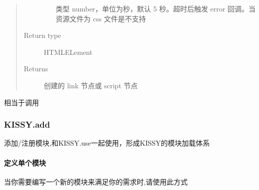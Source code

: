\documentclass[letterpaper,10pt,english]{sphinxmanual}
\begin{document}
\begin{fulllineitems}
\begin{quote}
\begin{description}
\begin{itemize}
\begin{fulllineitems}
\end{fulllineitems}



\begin{fulllineitems}
\label{api/seed/loader/getScript:Loader.config.timeout}
类型 number，单位为秒，默认 5 秒。超时后触发 error 回调。当资源文件为 css 文件是不支持

\end{fulllineitems}



\end{itemize}

\item[{Return type}] \leavevmode
HTMLELement

\item[{Returns}] \leavevmode
创建的 link 节点或 script 节点

\end{description}\end{quote}

\end{fulllineitems}



\begin{fulllineitems}
相当于调用 

\end{fulllineitems}



\subsubsection{KISSY.add}
\label{api/seed/loader/add:kissy-add}\label{api/seed/loader/add::doc}
添加/注册模块,和KISSY.use一起使用，形成KISSY的模块加载体系


\paragraph{定义单个模块}
\label{api/seed/loader/add:id1}
当你需要编写一个新的模块来满足你的需求时,请使用此方式
\end{document}
